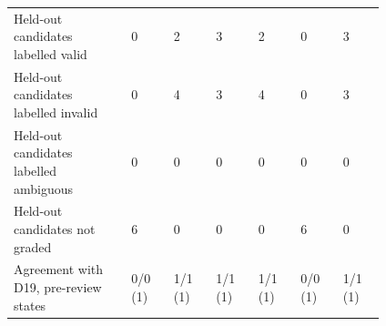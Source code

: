 \begin{table}[t]
\begin{tabular}{p{0.25\linewidth}p{0.093\linewidth}p{0.093\linewidth}p{0.093\linewidth}p{0.093\linewidth}p{0.093\linewidth}p{0.093\linewidth}}
\raggedright\hspace{0pt}Held-out candidates labelled valid & \raggedright\hspace{0pt}0 & \raggedright\hspace{0pt}2 & \raggedright\hspace{0pt}3 & \raggedright\hspace{0pt}2 & \raggedright\hspace{0pt}0 & \raggedright\hspace{0pt}3 \tabularnewline
\raggedright\hspace{0pt}Held-out candidates labelled invalid & \raggedright\hspace{0pt}0 & \raggedright\hspace{0pt}4 & \raggedright\hspace{0pt}3 & \raggedright\hspace{0pt}4 & \raggedright\hspace{0pt}0 & \raggedright\hspace{0pt}3 \tabularnewline
\raggedright\hspace{0pt}Held-out candidates labelled ambiguous & \raggedright\hspace{0pt}0 & \raggedright\hspace{0pt}0 & \raggedright\hspace{0pt}0 & \raggedright\hspace{0pt}0 & \raggedright\hspace{0pt}0 & \raggedright\hspace{0pt}0 \tabularnewline
\raggedright\hspace{0pt}Held-out candidates not graded & \raggedright\hspace{0pt}6 & \raggedright\hspace{0pt}0 & \raggedright\hspace{0pt}0 & \raggedright\hspace{0pt}0 & \raggedright\hspace{0pt}6 & \raggedright\hspace{0pt}0 \tabularnewline\midrule
\raggedright\hspace{0pt}Agreement with D19, pre-review states & \raggedright\hspace{0pt}0/0 (1) & \raggedright\hspace{0pt}1/1 (1) & \raggedright\hspace{0pt}1/1 (1) & \raggedright\hspace{0pt}1/1 (1) & \raggedright\hspace{0pt}0/0 (1) & \raggedright\hspace{0pt}1/1 (1) \tabularnewline

\end{tabular}
\end{table}
